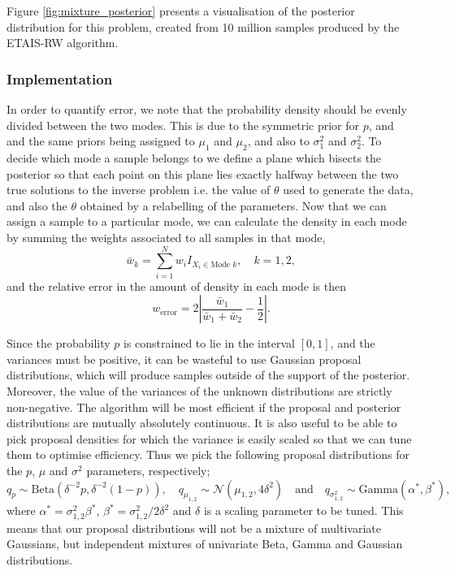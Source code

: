 \documentclass[final]{siamltex}
\newcommand{\revised}{}
\begin{document}
Figure \ref{fig:mixture_posterior} presents a visualisation of the
posterior distribution for this problem, created from 10 million
samples produced by the ETAIS-RW algorithm.


\subsubsection{Implementation}
\label{sec:mixture_implementation}
{\revised In order to quantify error, we note that} the probability density should
be evenly divided between the two modes. This is due to the symmetric
prior for $p$, and and the same priors being assigned to $\mu_1$ and
$\mu_2$, and also to $\sigma^2_1$ and $\sigma^2_2$. To decide which
mode a sample belongs to we define a plane which bisects the posterior
so that each point on this plane lies exactly halfway between the two
true solutions to the inverse problem i.e. the value of $\theta$ used
to generate the data, and also the $\theta$ obtained by a relabelling
of the parameters. Now that we can assign a sample to a particular
mode, we can calculate the density in each mode by summing the weights
associated to all samples in that mode,
\[
	\bar{w}_k = \sum\limits_{i=1}^N w_iI_{X_i \in \text{Mode $k$}}, \quad k = 1, 2,
\]
and the relative error in the amount of density in each mode is then
\begin{equation}\label{eqn:mode_prop}
	w_\text{error} = 2\left|\frac{\bar{w}_1}{\bar{w}_1+\bar{w}_2} - \frac{1}{2}\right|.
\end{equation}

Since the probability $p$ is constrained to lie in the interval
$[0,1]$, and the variances must be positive, it can be wasteful to use
Gaussian proposal distributions, {\revised which will produce samples outside of
the support of the posterior. Moreover, the value of the variances of
the unknown distributions are strictly non-negative. The algorithm
will be most efficient if the proposal and posterior distributions are
mutually absolutely continuous. It is also useful to be able to pick
proposal densities for which the variance is easily scaled so that we
can tune them to optimise efficiency. Thus we pick the following
proposal distributions for the $p$, $\mu$ and $\sigma^2$ parameters, respectively;}
\[
	q_p \sim \text{Beta}(\delta^{-2}p, \delta^{-2}(1-p)), \quad q_{\mu_{1,2}} \sim \mathcal{N}(\mu_{1,2}, 4\delta^2) \quad \text{and} \quad q_{\sigma^2_{1,2}} \sim \text{Gamma}(\alpha^*, \beta^*),
\]
where $\alpha^* = \sigma^2_{1,2}\beta^*$, $\beta^* =
\sigma^2_{1,2}/2\delta^2$ and $\delta$ is a scaling parameter to be
tuned. This means that our proposal distributions will not be a
mixture of multivariate Gaussians, but independent mixtures of
univariate Beta, Gamma and Gaussian distributions.
\end{document}
